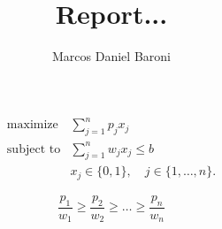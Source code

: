 \documentclass{article}
\title{Report...}
\author{Marcos Daniel Baroni}
\begin{document}
\maketitle

\begin{align*}
  \text{maximize} & \sum_{j=1}^n p_j x_j \\
  \text{subject to} & \sum_{j=1}^n w_j x_j \leq b \\
   & x_j \in \{0, 1\}, \quad j \in \{1, \ldots, n\}.
\end{align*}

\begin{displaymath}
  \frac{p_1}{w_1} \geqslant
  \frac{p_2}{w_2} \geqslant
  \ldots \geqslant
  \frac{p_n}{w_n}
\end{displaymath}

\section{}
\section{}
\section{}



\end{document}

